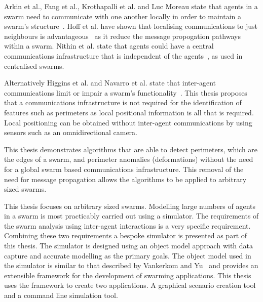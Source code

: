 Arkin et al., Fang et al., Krothapalli et al. and Luc Moreau state that agents in a swarm need to communicate with one another locally in order to maintain a swarm's structure~\cite{ABN:93, FAP:05, KD:99, MOR:05, PYP:01}. Hoff et al. have shown that localising communications to just neighbours is advantageous~\cite{HSWN:10} as it reduce the message propogation pathways within a swarm. Nithin et al. state that agents could have a central communications infrastructure that is independent of the agents~\cite{NVC:15}, as used in centralised swarms. 

Alternatively Higgins et al. and Navarro et al. state that inter-agent communications limit or impair a swarm's functionality~\cite{HTM:09, IGMFM:08}. This thesis proposes that a communications infrastructure is not required for the identification of features such as perimeters as local positional information is all that is required. Local positioning can be obtained without inter-agent communications by using sensors such as an omnidirectional camera.

This thesis demonstrates algorithms that are able to detect perimeters, which are the edges of a swarm, and perimeter anomalies (deformations) without the need for a global swarm based communications infrastructure. This removal of the need for message propagation allows the algorithms to be applied to arbitrary sized swarms.


This thesis focuses on arbitrary sized swarms. Modelling large numbers of agents in a swarm is most practicably carried out using a simulator. The requirements of the swarm analysis using inter-agent interactions is a very specific requirement. Combining these two requirements a bespoke simulator is presented as part of this thesis. The simulator is designed using an object model approach with data capture and accurate modelling as the primary goals. The object model used in the simulator is similar to that described by Vankerkom and Yu~\cite{VY:04} and provides an extensible framework for the development of swarming applications. This thesis uses the framework to create two applications. A graphical scenario creation tool and a command line simulation tool.

